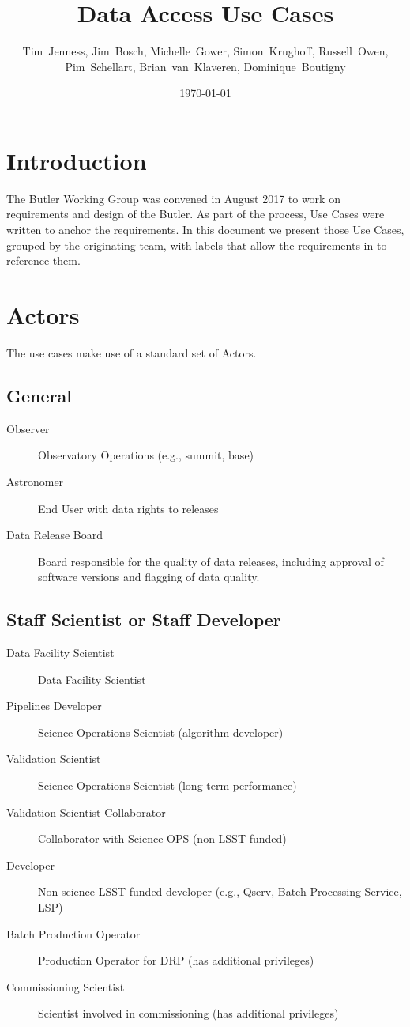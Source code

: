 \documentclass[DM,toc,lsstdraft]{lsstdoc}
\title{Data Access Use Cases}
\date{\today}
\author{Tim~Jenness, Jim~Bosch, Michelle~Gower, Simon~Krughoff,
Russell~Owen, Pim~Schellart, Brian~van~Klaveren, Dominique~Boutigny}
\begin{document}
%
%
\maketitle

\section{Introduction}

The Butler Working Group  was convened in August 2017 to work on requirements and design of the Butler.
As part of the process, Use Cases were written to anchor the requirements.
In this document we present those Use Cases, grouped by the originating team, with labels that allow the requirements in  to reference them.

\section{Actors}

The use cases make use of a standard set of Actors.

\subsection{General}

\begin{description}
\item[Observer] Observatory Operations (e.g., summit, base)
\item[Astronomer] End User with data rights to releases
\item[Data Release Board] Board responsible for the quality of data releases, including approval of software versions and flagging of data quality.
\end{description}

\subsection{Staff Scientist or Staff Developer}

\begin{description}
\item[Data Facility Scientist] Data Facility Scientist
\item[Pipelines Developer] Science Operations Scientist (algorithm developer)
\item[Validation Scientist] Science Operations Scientist (long term performance)
\item[Validation Scientist Collaborator] Collaborator with Science OPS (non-LSST funded)
\item[Developer] Non-science LSST-funded developer (e.g., Qserv, Batch Processing Service, LSP)
\item[Batch Production Operator] Production Operator for DRP (has additional privileges)
\item[Commissioning Scientist] Scientist involved in commissioning (has additional privileges)
\end{description}
\end{document}
